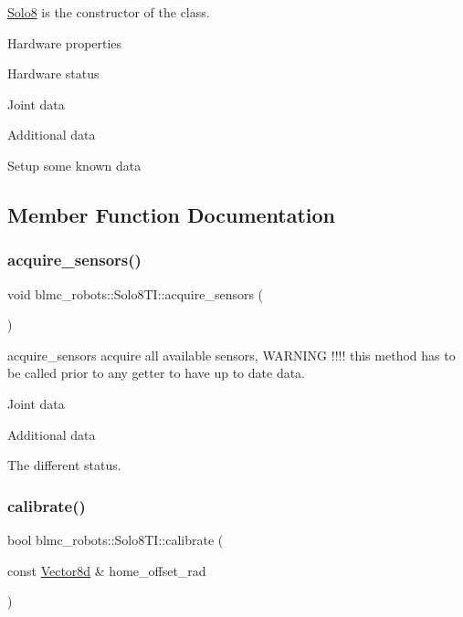 \hyperlink{classblmc__robots_1_1Solo8}{Solo8} is the constructor of the class. 

Hardware properties

Hardware status

Joint data

Additional data

Setup some known data

\subsection{Member Function Documentation}
\mbox{\label{classblmc__robots_1_1Solo8TI_a9241d0a805efd871a56d7cace099c208}} 
\subsubsection{\texorpdfstring{acquire\+\_\+sensors()}{acquire\_sensors()}}
{\footnotesize\ttfamily void blmc\+\_\+robots\+::\+Solo8\+T\+I\+::acquire\+\_\+sensors (\begin{DoxyParamCaption}{ }\end{DoxyParamCaption})}



acquire\+\_\+sensors acquire all available sensors, W\+A\+R\+N\+I\+NG !!!! this method has to be called prior to any getter to have up to date data. 

Joint data

Additional data

The different status.\mbox{\label{classblmc__robots_1_1Solo8TI_a8ff4ec509f904ab3fab7268c75065c1f}} 
\subsubsection{\texorpdfstring{calibrate()}{calibrate()}}
{\footnotesize\ttfamily bool blmc\+\_\+robots\+::\+Solo8\+T\+I\+::calibrate (\begin{DoxyParamCaption}\item[{const \hyperlink{common__header_8hpp_a98975ffbe0bca1296078e0350dfedd60}{Vector8d} \&}]{home\+\_\+offset\+\_\+rad }\end{DoxyParamCaption})}



